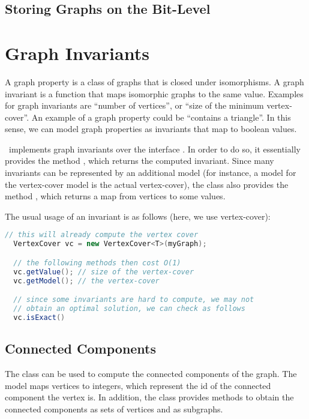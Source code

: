 \documentclass[a4paper, ukenglish, twoside, openright]{jdrasilmanual}
\begin{document}
\section{Storing Graphs on the Bit-Level}

\chapter{Graph Invariants}
A graph property is a class of graphs that is closed under
isomorphisms. A graph invariant is a function that maps isomorphic
graphs to the same value. Examples for graph invariants are ``number of
vertices'', or ``size of the minimum vertex-cover''. An example of a
graph property could be ``contains a triangle''. In this sense, we can
model graph properties as invariants that map to boolean values.

\Jdrasil\ implements graph invariants over the interface . In order to do so, it
essentially provides the method , which returns the
computed invariant.  Since many invariants can be represented by an
additional model (for instance, a model for the vertex-cover model
is the actual vertex-cover), the class also provides the method
, which returns a map from vertices to some values.

The usual usage of an invariant is as follows (here, we use
vertex-cover):
\begin{lstlisting}[language=Java]
  // this will already compute the vertex cover
  VertexCover vc = new VertexCover<T>(myGraph);

  // the following methods then cost O(1)
  vc.getValue(); // size of the vertex-cover
  vc.getModel(); // the vertex-cover

  // since some invariants are hard to compute, we may not 
  // obtain an optimal solution, we can check as follows
  vc.isExact()
\end{lstlisting}

\section{Connected Components}
The class  can be used to compute the
connected components of the graph. The model maps vertices to
integers, which represent the id of the connected component the vertex
is. In addition, the class provides methods to obtain the connected
components as sets of vertices and as subgraphs.
\end{document}
